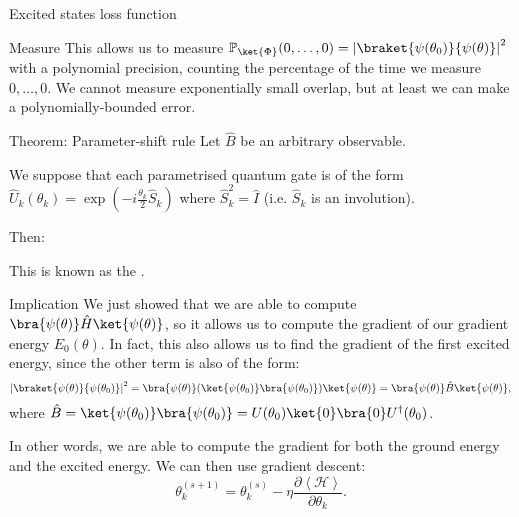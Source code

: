 \documentclass[a4paper]{article}
\begin{document}
\begin{parag}{Excited states loss function}
\begin{subparag}{Measure}
        This allows us to measure $\prob_{\ket{\Phi}}\left(0, \ldots, 0\right) = \left|\braket{\psi\left(\theta_0\right)}{\psi\left(\theta\right)}\right|^2$ with a polynomial precision, counting the percentage of the time we measure $0, \ldots, 0$.  We cannot measure exponentially small overlap, but at least we can make a polynomially-bounded error.
    \end{subparag}
\end{parag}

\begin{parag}{Theorem: Parameter-shift rule}
    Let $\hat{B}$ be an arbitrary observable.

    We suppose that each parametrised quantum gate is of the form $\hat{U}_k\left(\theta_k\right) = \exp\left(-i \frac{\theta_k}{2} \hat{S}_k\right)$ where $\hat{S}_k^2 = \hat{I}$ (i.e. $\hat{S}_k$ is an involution).

    Then:

    This is known as the .

    \begin{subparag}{Implication}
        We just showed that we are able to compute $\bra{\psi\left(\theta\right)} \hat{H} \ket{\psi\left(\theta\right)}$, so it allows us to compute the gradient of our gradient energy $E_0\left(\theta\right)$. In fact, this also allows us to find the gradient of the first excited energy, since the other term is also of the form: 
        \[\left|\braket{\psi\left(\theta\right)}{\psi\left(\theta_0\right)}\right|^2 = \bra{\psi\left(\theta\right)} \left(\ket{\psi\left(\theta_0\right)}\bra{\psi\left(\theta_0\right)}\right) \ket{\psi\left(\theta\right)} = \bra{\psi\left(\theta\right)} \hat{B} \ket{\psi\left(\theta\right)},\]
        where $\hat{B} =\ket{\psi\left(\theta_0\right)}\bra{\psi\left(\theta_0\right)} = U\left(\theta_0\right) \ket{0}\bra{0} U^{\dagger}\left(\theta_0\right)$.

        In other words, we are able to compute the gradient for both the ground energy and the excited energy. We can then use gradient descent:
    \[\theta_k^{\left(s+1\right)} = \theta_k^{\left(s\right)} - \eta \frac{\partial \left\langle \mathcal{H} \right\rangle}{\partial \theta_k}.\]
    \end{subparag}


\end{parag}
\end{document}

